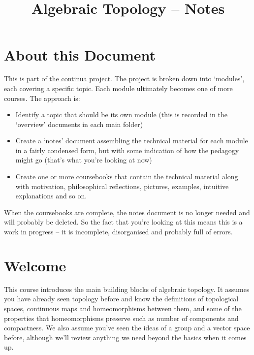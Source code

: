 \documentclass[oneside,english]{amsbook}
\numberwithin{section}{chapter}
\theoremstyle{plain}
\theoremstyle{definition}
\begin{document}
	
	\title{Algebraic Topology -- Notes}
	
	\maketitle
	
	\tableofcontents
	
	\chapter*{About this Document}
	
	This is part of \href{https://github.com/FineArtMaths/continua}{the continua project}. The project is broken down into `modules', each covering a specific topic. Each module ultimately becomes one of more courses. The approach is:
	
	\begin{itemize}
		\item{Identify a topic that should be its own module (this is recorded in the `overview' documents in each main folder)}
		\item{Create a `notes' document assembling the technical material for each module in a fairly condensed form, but with some indication of how the pedagogy might go (that's what you're looking at now)}
		\item{Create one or more coursebooks that contain the technical material along with motivation, philosophical reflections, pictures, examples, intuitive explanations and so on.}
	\end{itemize}
	
	When the coursebooks are complete, the notes document is no longer needed and will probably be deleted. So the fact that you're looking at this means this is a work in progress -- it is incomplete, disorganised and probably full of errors.
	
	\chapter*{Welcome}
	
	This course introduces the main building blocks of algebraic topology. It assumes you have already seen topology before and know the definitions of topological spaces, continuous maps and homeomorphisms between them, and some of the properties that homeomorphisms preserve such as number of components and compactness. We also assume you've seen the ideas of a group and a vector space before, although we'll review anything we need beyond the basics when it comes up.
	
\end{document}
